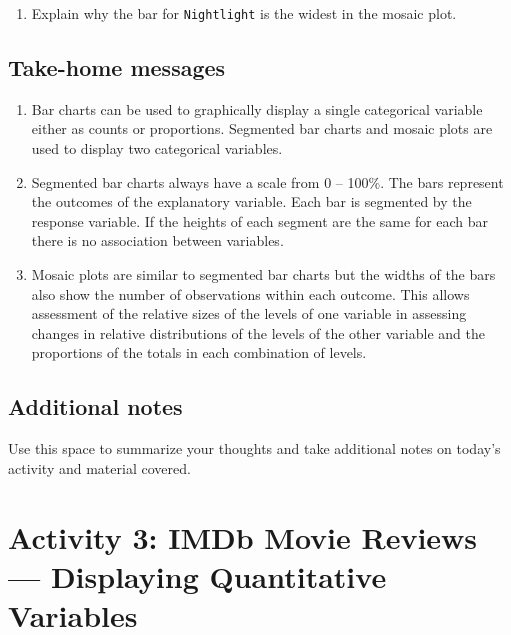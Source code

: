 \documentclass[
]{report}
\providecommand{\tightlist}{%
  \setlength{\itemsep}{0pt}\setlength{\parskip}{0pt}}
\begin{document}
\vspace{1in}

\begin{enumerate}
\def\labelenumi{\arabic{enumi}.}
\setcounter{enumi}{11}
\tightlist
\item
  Explain why the bar for \texttt{Nightlight} is the widest in the mosaic plot.
\end{enumerate}

\vspace{0.8in}

\newpage

\hypertarget{take-home-messages-4}{%
\subsection{Take-home messages}\label{take-home-messages-4}}

\begin{enumerate}
\def\labelenumi{\arabic{enumi}.}
\item
  Bar charts can be used to graphically display a single categorical variable either as counts or proportions. Segmented bar charts and mosaic plots are used to display two categorical variables.
\item
  Segmented bar charts always have a scale from 0 -- 100\%. The bars represent the outcomes of the explanatory variable. Each bar is segmented by the response variable. If the heights of each segment are the same for each bar there is no association between variables.
\item
  Mosaic plots are similar to segmented bar charts but the widths of the bars also show the number of observations within each outcome. This allows assessment of the relative sizes of the levels of one variable in assessing changes in relative distributions of the levels of the other variable and the proportions of the totals in each combination of levels.
\end{enumerate}

\hypertarget{additional-notes-4}{%
\subsection{Additional notes}\label{additional-notes-4}}

Use this space to summarize your thoughts and take additional notes on today's activity and material covered.

\newpage

\hypertarget{activity-3-imdb-movie-reviews-displaying-quantitative-variables}{%
\section{Activity 3: IMDb Movie Reviews --- Displaying Quantitative Variables}\label{activity-3-imdb-movie-reviews-displaying-quantitative-variables}}
\end{document}
